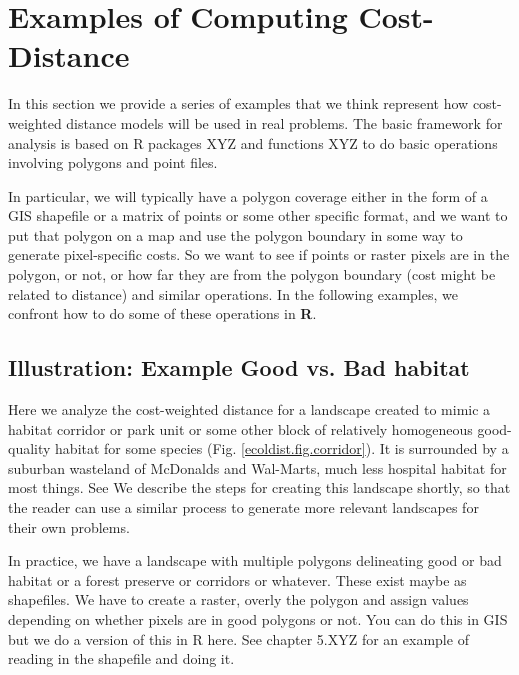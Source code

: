 \section{Examples of Computing Cost-Distance}

In this section we provide a series of examples that we think
represent how cost-weighted distance models will be used in real
problems. The basic framework for analysis is based on R packages XYZ
and functions XYZ to do basic operations involving polygons and point
files.

In particular, we will typically have a polygon coverage either in the
form of a GIS shapefile or a matrix of points or some other specific
format, and we want to put that polygon on a map and use the polygon
boundary in some way to generate pixel-specific costs. So we want to
see if points or raster pixels are in the polygon, or not, or how far
they are from the polygon boundary (cost might be related to distance)
and similar operations. In the following examples, we confront how to
do some of these operations in {\bf R}. 


\subsection{Illustration: Example Good vs. Bad habitat}

Here we analyze the cost-weighted distance for a landscape created to
mimic
a habitat corridor or park unit or some other block of
relatively homogeneous good-quality habitat for some species
(Fig. \ref{ecoldist.fig.corridor}).
It is surrounded by a suburban wasteland of McDonalds and Wal-Marts, much
less hospital habitat for most things. See
We describe the steps for creating this landscape shortly, so that the
reader can use a similar process to generate more relevant landscapes
for their own problems. 

In practice, we have a landscape with multiple polygons delineating
good or bad habitat or a forest preserve or corridors or
whatever. These exist maybe as shapefiles.
We have to create a raster, overly the polygon and assign values
depending on whether pixels are in good polygons or not.
You can do this in GIS but we do a version of this in R here. See
chapter 5.XYZ for an example of reading in the shapefile and doing it.

